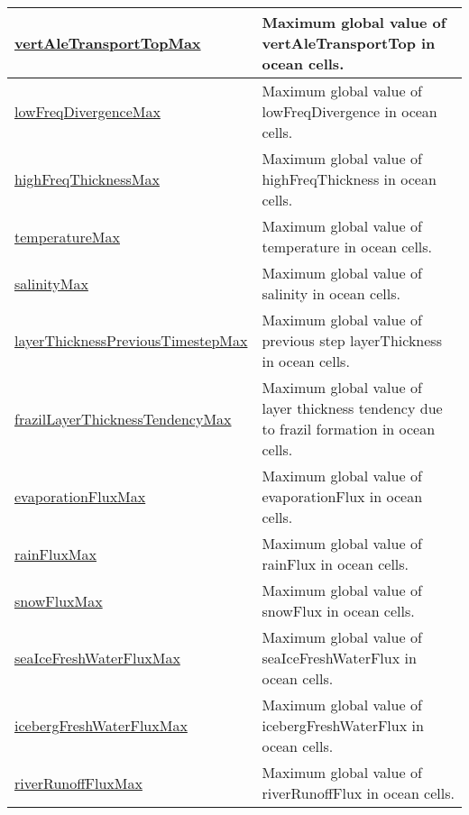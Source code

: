{\begin{center}
\begin{longtable}{| p{2.0in} | p{4.0in} |}
    \hline
    \hyperref[subsec:var_sec_globalStatsAM_vertAleTransportTopMax]{vertAleTransportTopMax} & Maximum global value of vertAleTransportTop in ocean cells. \\
    \hline
    \hyperref[subsec:var_sec_globalStatsAM_lowFreqDivergenceMax]{lowFreqDivergenceMax} & Maximum global value of lowFreqDivergence in ocean cells. \\
    \hline
    \hyperref[subsec:var_sec_globalStatsAM_highFreqThicknessMax]{highFreqThicknessMax} & Maximum global value of highFreqThickness in ocean cells. \\
    \hline
    \hyperref[subsec:var_sec_globalStatsAM_temperatureMax]{temperatureMax} & Maximum global value of temperature in ocean cells. \\
    \hline
    \hyperref[subsec:var_sec_globalStatsAM_salinityMax]{salinityMax} & Maximum global value of salinity in ocean cells. \\
    \hline
    \hyperref[subsec:var_sec_globalStatsAM_layerThicknessPreviousTimestepMax]{layerThicknessPreviousTimestep\-Max} & Maximum global value of previous step layerThickness in ocean cells. \\
    \hline
    \hyperref[subsec:var_sec_globalStatsAM_frazilLayerThicknessTendencyMax]{frazilLayerThicknessTendencyMax} & Maximum global value of layer thickness tendency due to frazil formation in ocean cells. \\
    \hline
    \hyperref[subsec:var_sec_globalStatsAM_evaporationFluxMax]{evaporationFluxMax} & Maximum global value of evaporationFlux in ocean cells. \\
    \hline
    \hyperref[subsec:var_sec_globalStatsAM_rainFluxMax]{rainFluxMax} & Maximum global value of rainFlux in ocean cells. \\
    \hline
    \hyperref[subsec:var_sec_globalStatsAM_snowFluxMax]{snowFluxMax} & Maximum global value of snowFlux in ocean cells. \\
    \hline
    \hyperref[subsec:var_sec_globalStatsAM_seaIceFreshWaterFluxMax]{seaIceFreshWaterFluxMax} & Maximum global value of seaIceFreshWaterFlux in ocean cells. \\
    \hline
    \hyperref[subsec:var_sec_globalStatsAM_icebergFreshWaterFluxMax]{icebergFreshWaterFluxMax} & Maximum global value of icebergFreshWaterFlux in ocean cells. \\
    \hline
    \hyperref[subsec:var_sec_globalStatsAM_riverRunoffFluxMax]{riverRunoffFluxMax} & Maximum global value of riverRunoffFlux in ocean cells. \\

\end{longtable}
\end{center}}
